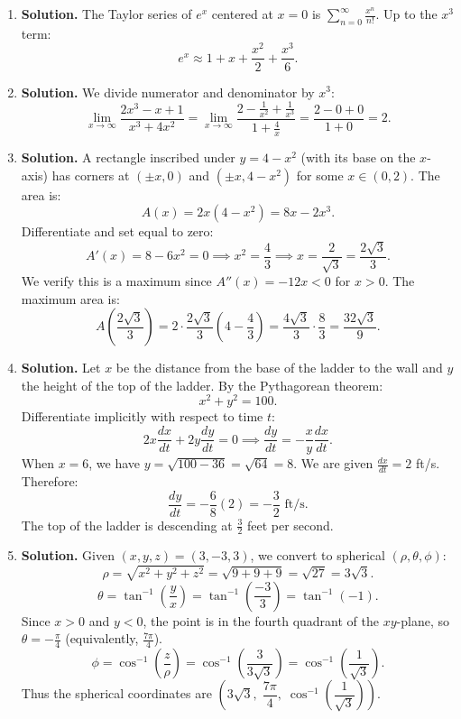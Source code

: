 \begin{enumerate}
\item \textbf{Solution.}
The Taylor series of \( e^x \) centered at \( x = 0 \) is \( \displaystyle\sum_{n=0}^{\infty} \frac{x^n}{n!} \). Up to the \( x^3 \) term:
\[
e^x \approx 1 + x + \frac{x^2}{2} + \frac{x^3}{6}.
\]

\item \textbf{Solution.}
We divide numerator and denominator by \( x^3 \):
\[
\lim_{x \to \infty} \frac{2x^3 - x + 1}{x^3 + 4x^2} = \lim_{x \to \infty} \frac{2 - \frac{1}{x^2} + \frac{1}{x^3}}{1 + \frac{4}{x}} = \frac{2 - 0 + 0}{1 + 0} = 2.
\]

\item \textbf{Solution.}
A rectangle inscribed under \( y = 4 - x^2 \) (with its base on the \( x \)-axis) has corners at \( (\pm x, 0) \) and \( (\pm x, 4 - x^2) \) for some \( x \in (0, 2) \). The area is:
\[
A(x) = 2x(4 - x^2) = 8x - 2x^3.
\]
Differentiate and set equal to zero:
\[
A'(x) = 8 - 6x^2 = 0 \implies x^2 = \frac{4}{3} \implies x = \frac{2}{\sqrt{3}} = \frac{2\sqrt{3}}{3}.
\]
We verify this is a maximum since \( A''(x) = -12x < 0 \) for \( x > 0 \). The maximum area is:
\[
A\!\left(\frac{2\sqrt{3}}{3}\right) = 2 \cdot \frac{2\sqrt{3}}{3}\left(4 - \frac{4}{3}\right) = \frac{4\sqrt{3}}{3} \cdot \frac{8}{3} = \frac{32\sqrt{3}}{9}.
\]

\item \textbf{Solution.}
Let \( x \) be the distance from the base of the ladder to the wall and \( y \) the height of the top of the ladder. By the Pythagorean theorem:
\[
x^2 + y^2 = 100.
\]
Differentiate implicitly with respect to time \( t \):
\[
2x\frac{dx}{dt} + 2y\frac{dy}{dt} = 0 \implies \frac{dy}{dt} = -\frac{x}{y}\frac{dx}{dt}.
\]
When \( x = 6 \), we have \( y = \sqrt{100 - 36} = \sqrt{64} = 8 \). We are given \( \frac{dx}{dt} = 2 \) ft/s. Therefore:
\[
\frac{dy}{dt} = -\frac{6}{8}(2) = -\frac{3}{2} \text{ ft/s}.
\]
The top of the ladder is descending at \( \frac{3}{2} \) feet per second.

\item \textbf{Solution.}
Given \( (x, y, z) = (3, -3, 3) \), we convert to spherical \( (\rho, \theta, \phi) \):
\[
\rho = \sqrt{x^2 + y^2 + z^2} = \sqrt{9 + 9 + 9} = \sqrt{27} = 3\sqrt{3}.
\]
\[
\theta = \tan^{-1}\!\left(\frac{y}{x}\right) = \tan^{-1}\!\left(\frac{-3}{3}\right) = \tan^{-1}(-1).
\]
Since \( x > 0 \) and \( y < 0 \), the point is in the fourth quadrant of the \( xy \)-plane, so \( \theta = -\frac{\pi}{4} \) (equivalently, \( \frac{7\pi}{4} \)).
\[
\phi = \cos^{-1}\!\left(\frac{z}{\rho}\right) = \cos^{-1}\!\left(\frac{3}{3\sqrt{3}}\right) = \cos^{-1}\!\left(\frac{1}{\sqrt{3}}\right).
\]
Thus the spherical coordinates are \( \left(3\sqrt{3},\; \dfrac{7\pi}{4},\; \cos^{-1}\!\!\left(\dfrac{1}{\sqrt{3}}\right)\right) \).


\end{enumerate}

